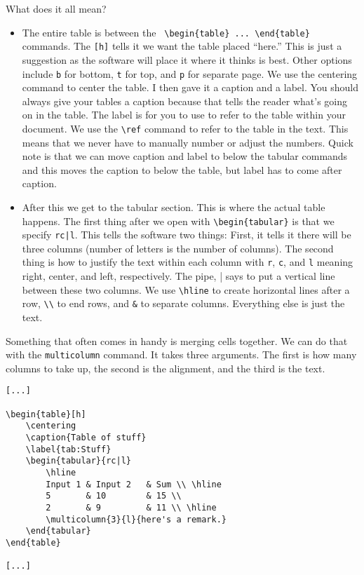 What does it all mean?

\begin{itemize}
\item The entire table is between the \verb| \begin{table} ... \end{table}| commands. The \texttt{[h]} tells it we want the table placed ``here.'' This is just a suggestion as the software will place it where it thinks is best. Other options include \texttt{b} for bottom, \texttt{t} for top, and \texttt{p} for separate page. We use the centering command to center the table. I then gave it a caption and a label. You should always give your tables a caption because that tells the reader what's going on in the table. The label is for you to use to refer to the table within your document. We use the \verb|\ref| command to refer to the table in the text. This means that we never have to manually number or adjust the numbers. Quick note is that we can move caption and label to below the tabular commands and this
moves the caption to below the table, but label has to come after caption.

\item After this we get to the tabular section. This is where the actual table happens. The first thing after we open with \verb|\begin{tabular}| is that we specify \texttt{rc|l}. This tells the software two
things: First, it tells it there will be three columns (number of letters is the number of
columns). The second thing is how to justify the text within each column with \texttt{r}, \texttt{c}, and \texttt{l} meaning right, center, and left, respectively. The pipe, | says to put a vertical line between these two columns. We use \verb|\hline| to create horizontal lines after a row, \verb|\\| to end rows, and \verb|&| to separate columns. Everything else is just the text.
\end{itemize}

Something that often comes in handy is merging cells together. We can do that with the \texttt{multicolumn} command. It takes three arguments. The first is how many columns to take up, the second is the alignment, and the third is the text.

\begin{lstlisting}
[...]

\begin{table}[h]
	\centering
	\caption{Table of stuff}
	\label{tab:Stuff}
	\begin{tabular}{rc|l}
		\hline
		Input 1	& Input 2	& Sum \\ \hline
		5 		& 10 		& 15 \\
		2 		& 9 		& 11 \\ \hline
		\multicolumn{3}{l}{here's a remark.}
	\end{tabular}
\end{table}

[...]
\end{lstlisting}


